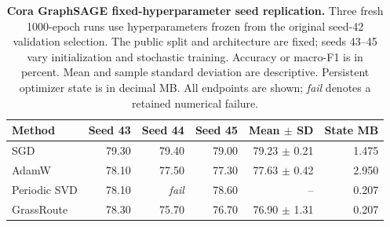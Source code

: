 \begin{table}[t]\centering\footnotesize
\caption{\textbf{Cora GraphSAGE fixed-hyperparameter seed replication.} Three fresh 1000-epoch runs use
hyperparameters frozen from the original seed-42 validation selection.
The public split and architecture are fixed; seeds 43--45 vary
initialization and stochastic training. Accuracy or macro-F1 is in
percent. Mean and sample standard deviation are descriptive.
Persistent optimizer state is in decimal MB. All endpoints are shown;
\emph{fail} denotes a retained numerical failure.}
\label{tab:focused-cora-replication}
\setlength{\tabcolsep}{7pt}
\begin{tabular}{lrrrrr}\toprule
Method & Seed 43 & Seed 44 & Seed 45 & Mean $\pm$ SD & State MB \\ \midrule
SGD & 79.30 & 79.40 & 79.00 & 79.23 $\pm$ 0.21 & 1.475 \\
AdamW & 78.10 & 77.50 & 77.30 & 77.63 $\pm$ 0.42 & 2.950 \\
Periodic SVD & 78.10 & \emph{fail} & 78.60 & -- & 0.207 \\
GrassRoute & \cellcolor{oursbg}78.30 & \cellcolor{oursbg}75.70 & \cellcolor{oursbg}76.70 & \cellcolor{oursbg}76.90 $\pm$ 1.31 & 0.207 \\
\bottomrule\end{tabular}\end{table}
